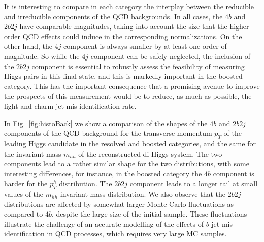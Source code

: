  It is interesting to compare in each category the interplay
 between the reducible and irreducible components of the
 QCD backgrounds.
 In all cases, the $4b$ and $2b2j$ have comparable
 magnitudes, taking into account the size that the higher-order QCD
 effects could induce in
 the corresponding normalizations.
 On the other hand, the $4j$ component
is always smaller by at least
 one order of magnitude.
  So while the $4j$ component can be safely
 neglected, the inclusion of the
 $2b2j$ component is essential to robustly assess the feasibility
 of measuring Higgs pairs in this final state, and this is markedly
 important
 in the boosted category.
 This has the important
 consequence that a promising avenue to improve the prospects
 of this measurement would be to reduce, as much as possible,
 the light and charm jet mis-identification rate.


 In Fig.~\ref{fig:histoBack} we show a
 comparison
    of the shapes of the $4b$ and $2b2j$
    components of the QCD background for the transverse momentum
    $p_T$ of the leading
Higgs candidate in the resolved
and boosted  categories, and the same
 for the invariant
mass $m_{hh}$ of the
    reconstructed di-Higgs system.
    The two components lead to a rather similar shape
    for the two distributions, with some interesting
    differences, for instance, in the boosted
    category the $4b$ component is harder for the
    $p_T^h$ distribution.
    The $2b2j$ component leads to a longer
    tail at small values of the $m_{hh}$ invariant
    mass distribution.
%
    We also observe that the $2b2j$ distributions
    are affected by somewhat larger
    Monte Carlo fluctuations as compared to $4b$, despite the large size
of the initial sample.
%
These fluctuations illustrate the challenge
of an accurate modelling of the effects
of $b$-jet mis-identification in QCD processes, which requires
very large MC samples.

